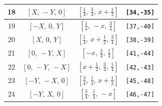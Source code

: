 \documentclass[fleqn,8pt]{jsarticle}
\begin{document}
\begin{longtable}{cccc}
18 & $\left[ X,\, - Y,\, 0 \right]$ & $\left[ \frac{1}{4},\, \frac{3}{4},\, x + \frac{1}{2} \right]$ & {\tt [34,-35]} \\ \hline
19 & $\left[ - X,\, 0,\, Y \right]$ & $\left[ \frac{1}{4},\, - x,\, \frac{3}{4} \right]$ & {\tt [37,-40]} \\ \hline
20 & $\left[ X,\, 0,\, Y \right]$ & $\left[ \frac{1}{4},\, x + \frac{1}{2},\, \frac{3}{4} \right]$ & {\tt [38,-39]} \\ \hline
21 & $\left[ 0,\, - Y,\, X \right]$ & $\left[ - x,\, \frac{3}{4},\, \frac{1}{4} \right]$ & {\tt [41,-44]} \\ \hline
22 & $\left[ 0,\, - Y,\, - X \right]$ & $\left[ x + \frac{1}{2},\, \frac{3}{4},\, \frac{1}{4} \right]$ & {\tt [42,-43]} \\ \hline
23 & $\left[ - Y,\, - X,\, 0 \right]$ & $\left[ \frac{3}{4},\, \frac{1}{4},\, x + \frac{1}{2} \right]$ & {\tt [45,-48]} \\ \hline
24 & $\left[ - Y,\, X,\, 0 \right]$ & $\left[ \frac{3}{4},\, \frac{1}{4},\, - x \right]$ & {\tt [46,-47]} \\
\end{longtable}
\renewcommand{\arraystretch}{1.2}
\end{document}
